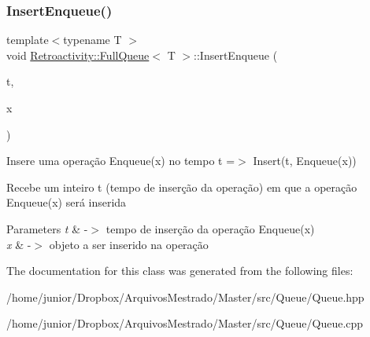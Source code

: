 \subsubsection{\texorpdfstring{Insert\+Enqueue()}{InsertEnqueue()}}
{\footnotesize\ttfamily template$<$typename T $>$ \\
void \hyperlink{classRetroactivity_1_1FullQueue}{Retroactivity\+::\+Full\+Queue}$<$ T $>$\+::Insert\+Enqueue (\begin{DoxyParamCaption}\item[{int}]{t,  }\item[{const T \&}]{x }\end{DoxyParamCaption})}

Insere uma operação Enqueue(x) no tempo t =$>$ Insert(t, Enqueue(x))

Recebe um inteiro t (tempo de inserção da operação) em que a operação Enqueue(x) será inserida


\begin{DoxyParams}{Parameters}
{\em t} & -\/$>$ tempo de inserção da operação Enqueue(x) \\
\hline
{\em x} & -\/$>$ objeto a ser inserido na operação \\
\hline
\end{DoxyParams}


The documentation for this class was generated from the following files\+:\begin{DoxyCompactItemize}
\item 
/home/junior/\+Dropbox/\+Arquivos\+Mestrado/\+Master/src/\+Queue/Queue.\+hpp\item 
/home/junior/\+Dropbox/\+Arquivos\+Mestrado/\+Master/src/\+Queue/Queue.\+cpp\end{DoxyCompactItemize}

